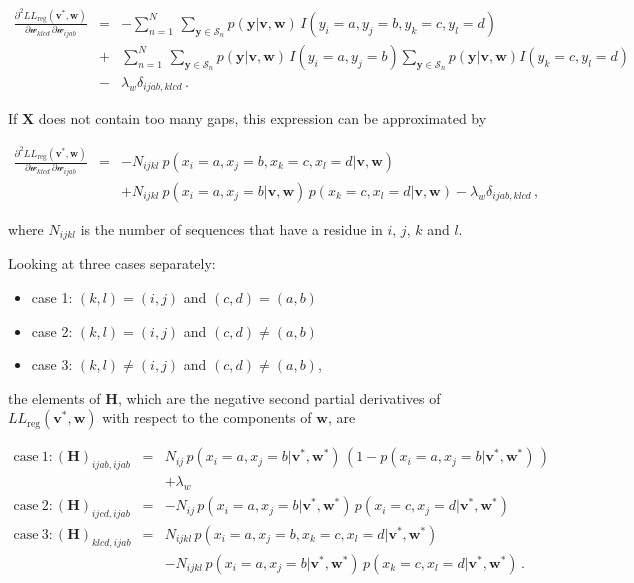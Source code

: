 \documentclass[12pt,a4paper,twoside]{book}
\providecommand{\tightlist}{%
  \setlength{\itemsep}{0pt}\setlength{\parskip}{0pt}}
\newcommand{\eq}{\!=\!}
\renewcommand{\H}{\mathbf{H}}
\newcommand{\LLreg}{L\!L_\mathrm{reg}}
\newcommand{\Sn}{\mathcal{S}_n}
\renewcommand{\v}{\mathbf{v}}
\newcommand{\w}{\mathbf{w}}
\newcommand{\wijab}{\mathcal{w}_{ijab}}
\newcommand{\wklcd}{\mathcal{w}_{klcd}}
\newcommand{\X}{\mathbf{X}}
\theoremstyle{definition}
\theoremstyle{definition}
\theoremstyle{remark}
\begin{document}
\begin{eqnarray}
    \frac{\partial^2 \LLreg(\v^*,\w)}{\partial \wklcd \, \partial \wijab} 
    &=&  -  \sum_{n=1}^{N} \, \sum_{\mathbf{y} \in \Sn} p(\mathbf{y} | \v,\w) \, I(y_i \eq a, y_j \eq b, y_k \eq c, y_l \eq d)  \\
    &+& \sum_{n=1}^{N} \, \sum_{\mathbf{y} \in \mathcal{S}_n} p(\mathbf{y} | \v,\w) \, I(y_i \eq a, y_j \eq b ) \sum_{\mathbf{y} \in \Sn} p(\mathbf{y} | \v,\w)  I(y_k \eq c, y_l \eq d ) \\
    &-& \lambda_w \delta_{ijab,klcd} \,.
\end{eqnarray}

If \(\X\) does not contain too many gaps, this expression can be
approximated by

\begin{eqnarray}
    \frac{\partial^2 \LLreg(\v^*,\w)}{\partial \wklcd \, \partial \wijab  } 
    &=& - N_{ijkl} \: p(x_i \eq a, x_j \eq b, x_k \eq c, x_l \eq d | \v,\w)  \nonumber \\
    && +  N_{ijkl} \: p(x_i \eq a, x_j \eq b | \v,\w) \, p(x_k \eq c, x_l \eq d | \v,\w) - \lambda_w \delta_{ijab,klcd} \,,
\end{eqnarray}

where \(N_{ijkl}\) is the number of sequences that have a residue in
\(i\), \(j\), \(k\) and \(l\).

Looking at three cases separately:

\begin{itemize}
\tightlist
\item
  case 1: \((k,l) = (i,j)\) and \((c,d) = (a,b)\)
\item
  case 2: \((k,l) = (i,j)\) and \((c,d) \ne (a,b)\)
\item
  case 3: \((k,l) \ne (i,j)\) and \((c,d) \ne (a,b)\),
\end{itemize}

the elements of \(\H\), which are the negative second partial
derivatives of \(\LLreg(\v^*,\w)\) with respect to the components of
\(\w\), are

\begin{eqnarray}
    \mathrm{case~1:} (\H)_{ijab, ijab}  
    &=&  N_{ij} \, p(x_i \eq a, x_j \eq b| \v^*,\w^*) \, ( 1 - p(x_i \eq a, x_j \eq b| \v^*,\w^*) \,) \\
    &&   + \lambda_w \\
    \mathrm{case~2:} (\H)_{ijcd, ijab}  
    &=&  - N_{ij} \, p(x_i \eq a, x_j \eq b |\v^*,\w^*) \, p(x_i \eq c, x_j \eq d |\v^*,\w^*) \\
    \mathrm{case~3:} (\H)_{klcd, ijab}  
    &=&   N_{ijkl} \, p(x_i \eq a, x_j \eq b, x_k \eq c, x_l \eq d  | \v^*,\w^*) \nonumber \\
    &&    - N_{ijkl} \, p(x_i \eq a, x_j \eq b | \v^*,\w^*)\, p(x_k \eq c, x_l \eq d | \v^*,\w^*) \,.
\label{eq:Hw-offdiag}
\end{eqnarray}
\end{document}
